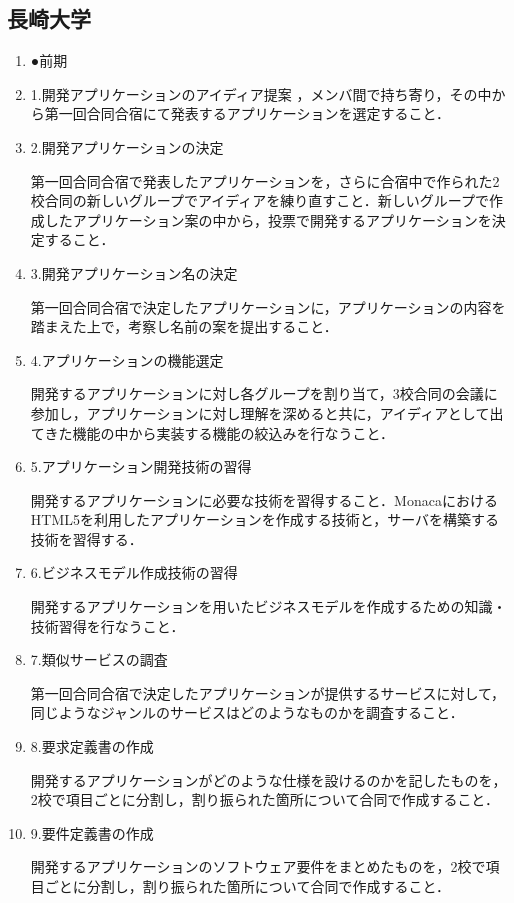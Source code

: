\subsection{長崎大学}
\begin{enumerate}
\par 長崎大はアプリケーションの提案，開発，未来大と神菜工との潤滑な連携のために以下の課題を設定した
\item ●前期
\item 1.開発アプリケーションのアイディア提案
，メンバ間で持ち寄り，その中から第一回合同合宿にて発表するアプリケーションを選定すること．
\item 2.開発アプリケーションの決定
\par 第一回合同合宿で発表したアプリケーションを，さらに合宿中で作られた2校合同の新しいグループでアイディアを練り直すこと．新しいグループで作成したアプリケーション案の中から，投票で開発するアプリケーションを決定すること．
\item 3.開発アプリケーション名の決定
\par 第一回合同合宿で決定したアプリケーションに，アプリケーションの内容を踏まえた上で，考察し名前の案を提出すること． 
\item 4.アプリケーションの機能選定
\par 開発するアプリケーションに対し各グループを割り当て，3校合同の会議に参加し，アプリケーションに対し理解を深めると共に，アイディアとして出てきた機能の中から実装する機能の絞込みを行なうこと．
\item 5.アプリケーション開発技術の習得
\par 開発するアプリケーションに必要な技術を習得すること．MonacaにおけるHTML5を利用したアプリケーションを作成する技術と，サーバを構築する技術を習得する．
\item 6.ビジネスモデル作成技術の習得
\par 開発するアプリケーションを用いたビジネスモデルを作成するための知識・技術習得を行なうこと．
\item 7.類似サービスの調査
\par 第一回合同合宿で決定したアプリケーションが提供するサービスに対して，同じようなジャンルのサービスはどのようなものかを調査すること．
\item 8.要求定義書の作成
\par 開発するアプリケーションがどのような仕様を設けるのかを記したものを，2校で項目ごとに分割し，割り振られた箇所について合同で作成すること．
\item 9.要件定義書の作成
\par 開発するアプリケーションのソフトウェア要件をまとめたものを，2校で項目ごとに分割し，割り振られた箇所について合同で作成すること．

\end{enumerate}
